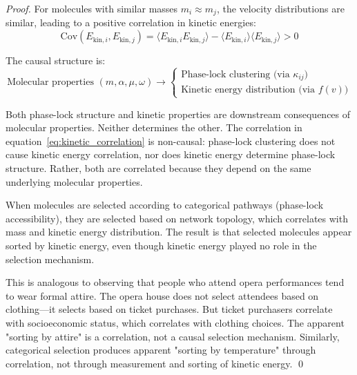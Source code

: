 \documentclass[12pt,a4paper]{article}
\theoremstyle{definition}
\theoremstyle{remark}
\begin{document}
\begin{proof}
For molecules with similar masses $m_i \approx m_j$, the velocity distributions are similar, leading to a positive correlation in kinetic energies:
\begin{equation}
\text{Cov}(E_{\text{kin},i}, E_{\text{kin},j}) = \langle E_{\text{kin},i} E_{\text{kin},j} \rangle - \langle E_{\text{kin},i} \rangle \langle E_{\text{kin},j} \rangle > 0
\end{equation}

The causal structure is:
\begin{equation}
\text{Molecular properties } (m, \alpha, \mu, \omega) \to \begin{cases} \text{Phase-lock clustering (via } \kappa_{ij}\text{)} \\ \text{Kinetic energy distribution (via } f(v)\text{)} \end{cases}
\end{equation}

Both phase-lock structure and kinetic properties are downstream consequences of molecular properties. Neither determines the other. The correlation in equation~\eqref{eq:kinetic_correlation} is non-causal: phase-lock clustering does not cause kinetic energy correlation, nor does kinetic energy determine phase-lock structure. Rather, both are correlated because they depend on the same underlying molecular properties.

When molecules are selected according to categorical pathways (phase-lock accessibility), they are selected based on network topology, which correlates with mass and kinetic energy distribution. The result is that selected molecules appear sorted by kinetic energy, even though kinetic energy played no role in the selection mechanism.

This is analogous to observing that people who attend opera performances tend to wear formal attire. The opera house does not select attendees based on clothing—it selects based on ticket purchases. But ticket purchasers correlate with socioeconomic status, which correlates with clothing choices. The apparent "sorting by attire" is a correlation, not a causal selection mechanism. Similarly, categorical selection produces apparent "sorting by temperature" through correlation, not through measurement and sorting of kinetic energy. \qed
\end{proof}
\end{document}
